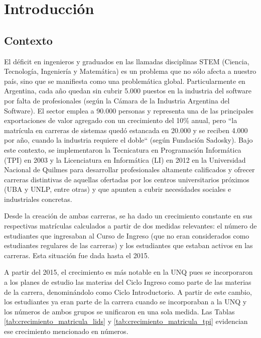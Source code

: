 \chapter{Introducción}
\label{sec:introduccion}

\section[Contexto]{Contexto}
El déficit en ingenieros y graduados en las llamadas disciplinas STEM (Ciencia, Tecnología, Ingeniería y Matemática) es un problema que no sólo afecta a nuestro país, sino que se manifiesta como una problemática global. Particularmente en Argentina, cada año quedan sin cubrir 5.000 puestos en la industria del software por falta de profesionales (según la Cámara de la Industria Argentina del Software). El sector emplea a 90.000 personas y representa una de las principales exportaciones de valor agregado con un crecimiento del 10\% anual, pero “la matrícula en carreras de sistemas quedó estancada en 20.000 y se reciben 4.000 por año, cuando la industria requiere el doble“ (según Fundación Sadosky).
Bajo este contexto, se implementaron la Tecnicatura en Programación Informática (TPI) en 2003 y la Licenciatura en Informática (LI) en 2012 en la Universidad Nacional de Quilmes para desarrollar profesionales altamente calificados y ofrecer carreras distintivas de aquellas ofertadas por los centros universitarios próximos (UBA y UNLP, entre otras) y que apunten a cubrir necesidades sociales e industriales concretas.
 
Desde la creación de ambas carreras, se ha dado un crecimiento constante  en sus respectivas matrículas calculados a partir de dos medidas relevantes: el número de estudiantes que ingresaban al Curso de Ingreso (que no eran considerados como estudiantes regulares de las carreras) y los estudiantes que estaban activos en las carreras. Esta situación fue dada hasta el 2015. 

A partir del 2015, el crecimiento es más notable en la UNQ pues se incorporaron a los planes de estudio las materias del Ciclo Ingreso como parte de las materias de la carrera, denominándolo como Ciclo Introductorio. A partir de este cambio, los estudiantes ya eran parte de la carrera cuando se incorporaban a la UNQ y los números de ambos grupos se unificaron en una sola medida. Las Tablas \ref{tab:crecimiento_matricula_lids} y \ref{tab:crecimiento_matricula_tpi} evidencian ese crecimiento mencionado en números.


